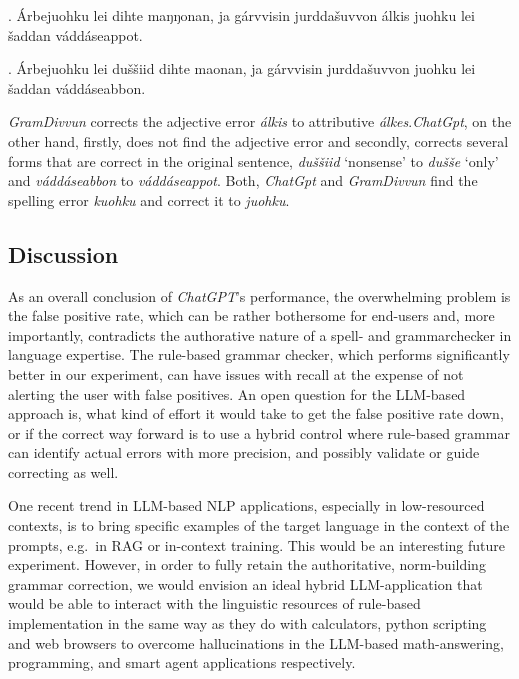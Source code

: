 \documentclass[free]{flammie}
\newcommand\gecfail{\bgroup\markoverwith%
{\textcolor{blue}{\lower3.5pt\hbox{\sixly{}\char58}}}\ULon}
\begin{document}

    \ex. Árbejuohku lei \gecfail{dušše} dihte
     maŋŋonan, ja gárvvisin jurd­dašuvvon álkis
    juohku lei šaddan váddáseappot.\label{arbejuohku-gpt}


    \ex. Árbejuohku lei duššiid dihte
    ma\ng\ng{}onan, ja gárvvisin jurd­dašuvvon \gecfail{álkes}
    juohku lei šaddan váddáseabbon.\label{arbejuohku-gd}


\textit{GramDivvun} corrects the adjective error \textit{álkis} to attributive
\textit{álkes}.\@ \textit{ChatGpt}, on the other hand, firstly, does not find the
adjective error and secondly, corrects several forms that are correct in the
original sentence, \textit{duššiid} `nonsense' to \textit{dušše} `only' and
\textit{váddáseabbon} to \textit{váddáseappot}.  Both, \textit{ChatGpt} and
\textit{GramDivvun} find the spelling error \textit{kuohku} and correct it to
\textit{juohku}.




\subsection{Discussion}

As an overall conclusion of \textit{ChatGPT}'s performance, the overwhelming
problem is the false positive rate, which can be rather bothersome for end-users
and, more importantly, contradicts the authorative nature of a spell- and
grammarchecker in language expertise. The rule-based grammar checker, which
performs significantly better in our experiment, can have issues with recall at
the expense of not alerting the user with false positives. An open question for
the LLM-based approach is, what kind of effort it would take to get the false
positive rate down, or if the correct way forward is to use a hybrid control
where rule-based grammar can identify actual errors with more precision, and
possibly validate or guide correcting as well.

One recent trend in LLM-based NLP applications, especially in low-resourced
contexts, is to bring specific examples of the target language in the context of
the prompts, e.g.\ in RAG or in-context training. This would be an interesting
future experiment. However, in order to fully retain the authoritative,
norm-building grammar correction, we would envision an ideal hybrid
LLM-application that would be able to interact with the linguistic resources of
rule-based implementation in the same way as they do with calculators, python
scripting and web browsers to overcome hallucinations in the LLM-based
math-answering, programming, and smart agent applications respectively.
\end{document}
